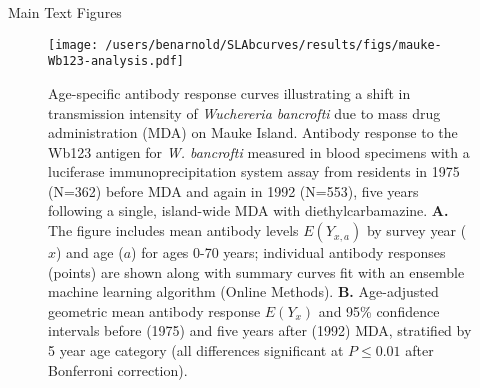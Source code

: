 \documentclass[11pt]{article}
\title{}
\author{}
\date{}
\begin{document}
\begin{center}
{\Large Main Text Figures}
\end{center}
\vspace{50pt}

\begin{figure}[htbp]
\begin{center}
\texttt{[image: /users/benarnold/SLAbcurves/results/figs/mauke-Wb123-analysis.pdf]}
\begin{minipage}{\textwidth}
\caption{Age-specific antibody response curves illustrating a shift in transmission intensity of \textit{Wuchereria bancrofti} due to mass drug administration (MDA) on Mauke Island.  Antibody response to the Wb123 antigen for \textit{W. bancrofti} measured in blood specimens with a luciferase immunoprecipitation system assay from residents in 1975 (N=362) before MDA and again in 1992 (N=553), five years following a single, island-wide MDA with diethylcarbamazine. \textbf{A.} The figure includes mean antibody levels $E(Y_{x,a})$ by survey year ($x$) and age ($a$) for ages 0-70 years; individual antibody responses (points) are shown along with summary curves fit with an ensemble machine learning algorithm (Online Methods). \textbf{B.} Age-adjusted geometric mean antibody response $E(Y_{x})$ and 95\% confidence intervals before (1975) and five years after (1992) MDA, stratified by 5 year age category (all differences significant at $P\leq0.01$ after Bonferroni correction).  }
\label{fig:mauke}
\end{minipage}
\end{center}
\end{figure}


\end{document}
